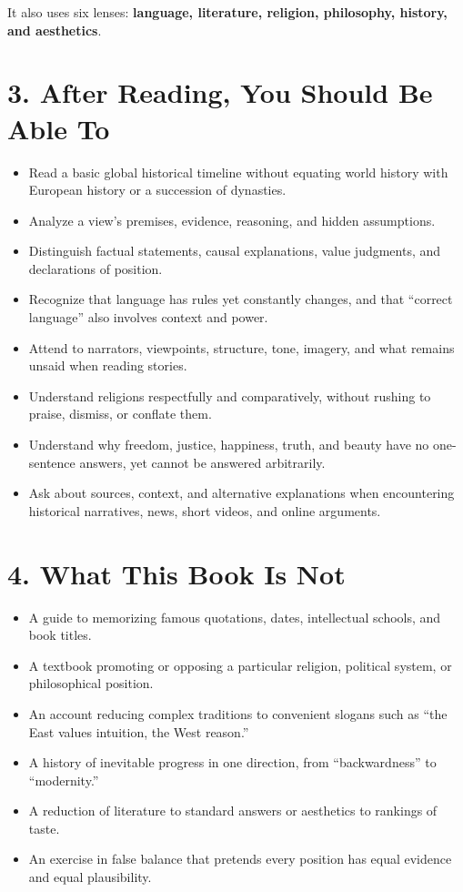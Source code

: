 It also uses six lenses: \textbf{language, literature, religion, philosophy, history, and aesthetics}.

\section*{3. After Reading, You Should Be Able To}
\begin{itemize}
\item Read a basic global historical timeline without equating world history with European history or a succession of dynasties.
\item Analyze a view's premises, evidence, reasoning, and hidden assumptions.
\item Distinguish factual statements, causal explanations, value judgments, and declarations of position.
\item Recognize that language has rules yet constantly changes, and that ``correct language'' also involves context and power.
\item Attend to narrators, viewpoints, structure, tone, imagery, and what remains unsaid when reading stories.
\item Understand religions respectfully and comparatively, without rushing to praise, dismiss, or conflate them.
\item Understand why freedom, justice, happiness, truth, and beauty have no one-sentence answers, yet cannot be answered arbitrarily.
\item Ask about sources, context, and alternative explanations when encountering historical narratives, news, short videos, and online arguments.
\end{itemize}
\section*{4. What This Book Is Not}
\begin{itemize}
\item A guide to memorizing famous quotations, dates, intellectual schools, and book titles.
\item A textbook promoting or opposing a particular religion, political system, or philosophical position.
\item An account reducing complex traditions to convenient slogans such as ``the East values intuition, the West reason.''
\item A history of inevitable progress in one direction, from ``backwardness'' to ``modernity.''
\item A reduction of literature to standard answers or aesthetics to rankings of taste.
\item An exercise in false balance that pretends every position has equal evidence and equal plausibility.
\end{itemize}
